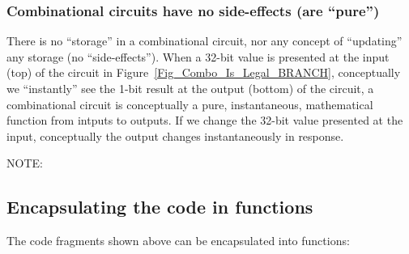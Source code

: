 
\subsubsection{Combinational circuits have no side-effects (are ``pure'')}


There is no ``storage'' in a combinational circuit, nor any concept of
``updating'' any storage (no ``side-effects'').  When a 32-bit value
is presented at the input (top) of the circuit in
Figure~\ref{Fig_Combo_Is_Legal_BRANCH}, conceptually we
``instantly'' see the 1-bit result at the output (bottom) of the
circuit, {\ie} a combinational circuit is conceptually a pure,
instantaneous, mathematical function from intputs to outputs.  If we
change the 32-bit value presented at the input, conceptually the
output changes instantaneously in response.



NOTE: 



\subsection{Encapsulating the code in functions}

\label{BSV_functions_2}

The code fragments shown above can be encapsulated into {\BSV}
functions:



